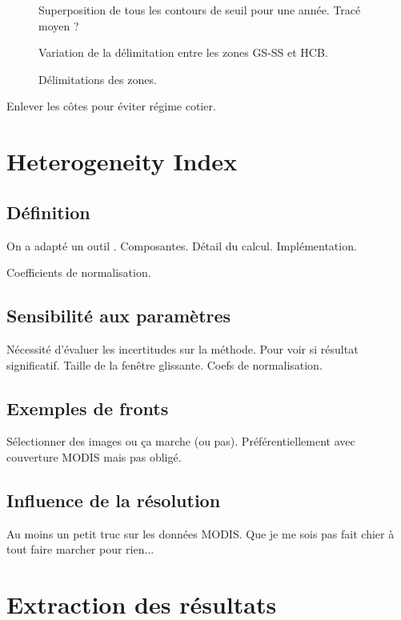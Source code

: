 \begin{figure}
  Superposition de tous les contours de seuil pour une année.
  Tracé moyen ?
  \caption{Variation de la délimitation entre les zones GS-SS et HCB.}
  \label{fig:var-delim}
\end{figure}


\begin{figure}
  \caption{Délimitations des zones.}
  \label{fig:zone-delimitation}
\end{figure}

Enlever les côtes pour éviter régime cotier.

\section{Heterogeneity Index}
\subsection{Définition}

On a adapté un outil \parencite{liu_2016}.
Composantes.
Détail du calcul.
Implémentation.

Coefficients de normalisation.

\subsection{Sensibilité aux paramètres}

Nécessité d'évaluer les incertitudes sur la méthode.
Pour voir si résultat significatif.
Taille de la fenêtre glissante. Coefs de normalisation.

\subsection{Exemples de fronts}

Sélectionner des images ou ça marche (ou pas).
Préférentiellement avec couverture MODIS mais pas obligé.

\subsection{Influence de la résolution}

Au moins un petit truc sur les données MODIS.
Que je me sois pas fait chier à tout faire marcher pour rien...

\section{Extraction des résultats}

